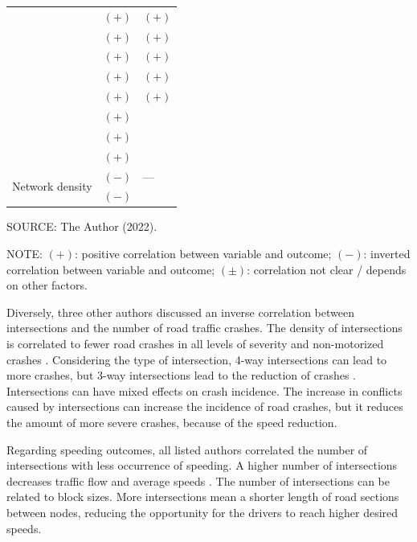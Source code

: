 \begin{table}[!hbtp]
\begin{tabular}{p{2.5cm}p{6.2cm}p{6.2cm}}
         & $(+)$ \textcite{Dumbaugh2011} & $(+)$ \textcite{Dumbaugh2013} \\
         & $(+)$ \textcite{Dumbaugh2013} & $(+)$ \textcite{Ewing2009} \\
         & $(+)$ \textcite{Ewing2009} & $(+)$ \textcite{Huang2018} \\
         & $(+)$ \textcite{Huang2018} & $(+)$ \textcite{Obelheiro2020} \\
         & $(+)$ \textcite{Obelheiro2020} & $(+)$ \textcite{Welle2016} \\
         & $(+)$ \textcite{Ukkusuri2012} &  \\
         & $(+)$ \textcite{Welle2016} &  \\
         & $(+)$ \textcite{Yu2017} &  \\ \hline
        \multirow{2}{2cm}{Network density} & $(-)$ \textcite{Marshall2010} & --- \\
         & $(-)$ \textcite{Marshall2011} &  \\ \hline
        \end{tabular}
    \label{tab:design}
    \par \vspace{1mm} \footnotesize \raggedright
    SOURCE: The Author (2022).
    \par \vspace{1mm} \footnotesize \raggedright
    NOTE: $(+)$: positive correlation between variable and outcome; $(-)$: inverted correlation between variable and outcome; $(\pm)$: correlation not clear / depends on other factors.
\end{table}

Diversely, three other authors discussed an inverse correlation between intersections and the number of road traffic crashes. The density of intersections is correlated to fewer road crashes in all levels of severity \cite{Marshall2011, Ouyang2014} and non-motorized crashes \cite{Zhang2015}. Considering the type of intersection, 4-way intersections can lead to more crashes, but 3-way intersections lead to the reduction of crashes \cite{Ewing2009}. Intersections can have mixed effects on crash incidence. The increase in conflicts caused by intersections can increase the incidence of road crashes, but it reduces the amount of more severe crashes, because of the speed reduction.  

Regarding speeding outcomes, all listed authors correlated the number of intersections with less occurrence of speeding. A higher number of intersections decreases traffic flow and average speeds \cite{Elvik2009,Ewing2009}. The number of intersections can be related to block sizes. More intersections mean a shorter length of road sections between nodes, reducing the opportunity for the drivers to reach higher desired speeds.

